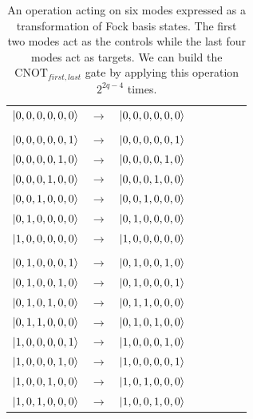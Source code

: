 \documentclass[aps,pra,twocolumn,showpacs,superscriptaddress,floatfix,10pt]{revtex4}
\begin{document}
\begin {table}[h]
\begin{center}
	\begin{tabular}{l*{6}{c}r} 
		$\ket{0,0,0,0,0,0}$  &  $\rightarrow$ & $\ket{0,0,0,0,0,0}$ \\ \\
		$\ket{0,0,0,0,0,1}$  & $\rightarrow$ & $\ket{0,0,0,0,0,1}$ \\
		$\ket{0,0,0,0,1,0}$ & $\rightarrow$ & $\ket{0,0,0,0,1,0}$ \\
		$\ket{0,0,0,1,0,0}$ & $\rightarrow$ & $\ket{0,0,0,1,0,0} $ \\ 
		$\ket{0,0,1,0,0,0}$ & $\rightarrow$ & $\ket{0,0,1,0,0,0} $\\
		$\ket{0,1,0,0,0,0}$ & $\rightarrow$ & $\ket{0,1,0,0,0,0} $ \\
		$\ket{1,0,0,0,0,0}$ & $\rightarrow$ & $\ket{1,0,0,0,0,0} $ \\ \\
		$\ket{0,1,0,0,0,1}$  & $\rightarrow$ & $\ket{0,1,0,0,1,0}$ \\
		$\ket{0,1,0,0,1,0}$  & $\rightarrow$ & $\ket{0,1,0,0,0,1}$ \\
		$\ket{0,1,0,1,0,0}$  & $\rightarrow$ & $\ket{0,1,1,0,0,0}$ \\
		$\ket{0,1,1,0,0,0}$  & $\rightarrow$ & $\ket{0,1,0,1,0,0}$ \\
		$\ket{1,0,0,0,0,1}$  & $\rightarrow$ & $\ket{1,0,0,0,1,0}$ \\
		$\ket{1,0,0,0,1,0}$  & $\rightarrow$ & $\ket{1,0,0,0,0,1}$ \\
		$\ket{1,0,0,1,0,0}$  & $\rightarrow$ & $\ket{1,0,1,0,0,0}$ \\
		$\ket{1,0,1,0,0,0}$  & $\rightarrow$ & $\ket{1,0,0,1,0,0}$ \\
	\end{tabular}
	\caption{ \label{Two Controls Four Targets} An operation acting on six modes expressed as a transformation of Fock basis states. The first two modes act as the controls while the last four modes act as targets. We can build the $\mbox{CNOT}_{first,last}$ gate by applying this operation $2^{2 q - 4}$ times.}
\end{center}
\end{table}
\end{document}
